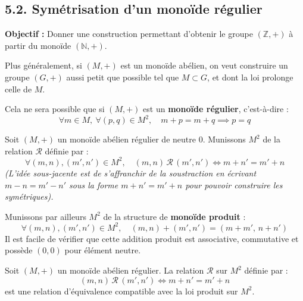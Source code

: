 \documentclass[a4paper,11pt]{article}
\newcommand{\N}{\mathbb{N}}
\newcommand{\Z}{\mathbb{Z}}
\newcommand{\mot}[1]{\textcolor{bordeaux}{\textbf{#1}}}
\begin{document}
\newpage
\subsection{5.2. Symétrisation d'un monoïde régulier}

\textbf{Objectif :} Donner une construction permettant d'obtenir le groupe $(\Z, +)$ à partir du monoïde $(\N, +)$.

Plus généralement, si $(M, +)$ est un monoïde abélien, on veut construire un groupe $(G, +)$ aussi petit que possible tel que $M \subset G$, et dont la loi prolonge celle de $M$.

Cela ne sera possible que si $(M, +)$ est un \mot{monoïde régulier}, c'est-à-dire :
\[
\forall m \in M, \ \forall (p, q) \in M^2, \quad m + p = m + q \implies p = q
\]

Soit $(M, +)$ un monoïde abélien régulier de neutre $0$. Munissons $M^2$ de la relation $\mathcal{R}$ définie par :
\[
\forall (m, n), (m', n') \in M^2, \quad (m, n) \, \mathcal{R} \, (m', n') \iff m + n' = m' + n
\]
\textit{(L'idée sous-jacente est de s'affranchir de la soustraction en écrivant $m - n = m' - n'$ sous la forme $m + n' = m' + n$ pour pouvoir construire les symétriques).}

Munissons par ailleurs $M^2$ de la structure de \mot{monoïde produit} :
\[
\forall (m, n), (m', n') \in M^2, \quad (m, n) + (m', n') = (m + m', \, n + n')
\]
Il est facile de vérifier que cette addition produit est associative, commutative et possède $(0, 0)$ pour élément neutre.

\begin{theoreme}
Soit $(M, +)$ un monoïde abélien régulier. La relation $\mathcal{R}$ sur $M^2$ définie par :
\[
(m, n) \, \mathcal{R} \, (m', n') \iff m + n' = m' + n
\]
est une relation d'équivalence compatible avec la loi produit sur $M^2$.
\end{theoreme}
\end{document}
